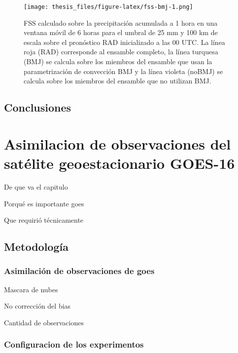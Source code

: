 \documentclass[12pt,oneside]{reedthesis}
\begin{document}
\begin{figure}
\centering
\texttt{[image: thesis\_files/figure-latex/fss-bmj-1.png]}
\caption{\label{fig:fss-bmj}FSS calculado sobre la precipitación acumulada a 1 hora en una ventana móvil de 6 horas para el umbral de 25 mm y 100 km de escala sobre el pronóstico RAD inicializado a las 00 UTC. La línea roja (RAD) corresponde al ensamble completo, la línea turquesa (BMJ) se calcula sobre los miembros del ensamble que usan la parametrización de convección BMJ y la línea violeta (noBMJ) se calcula sobre los miembros del ensamble que no utilizan BMJ.}
\end{figure}
\hypertarget{conclusiones-1}{%
\section{Conclusiones}\label{conclusiones-1}}

\hypertarget{asimilacion-de-observaciones-del-satuxe9lite-geoestacionario-goes-16}{%
\chapter{Asimilacion de observaciones del satélite geoestacionario GOES-16}\label{asimilacion-de-observaciones-del-satuxe9lite-geoestacionario-goes-16}}

De que va el capitulo

Porqué es importante goes

Que requirió técnicamente

\hypertarget{metodologuxeda-2}{%
\section{Metodología}\label{metodologuxeda-2}}

\hypertarget{asim-goes}{%
\subsection{Asimilación de observaciones de goes}\label{asim-goes}}

Mascara de nubes

No corrección del bias

Cantidad de observaciones

\hypertarget{configuracion-de-los-experimentos-1}{%
\subsection{Configuracion de los experimentos}\label{configuracion-de-los-experimentos-1}}
\end{document}
